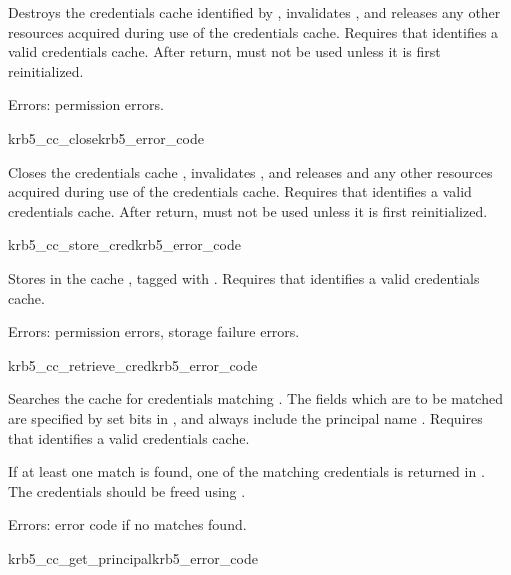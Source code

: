 Destroys the credentials cache identified by , invalidates
, and releases any other resources acquired during use of
the credentials cache.  Requires that  identifies a valid
credentials cache.  After return,  must not be used unless
it is first reinitialized.

Errors:  permission errors.

\begin{funcdecl}{krb5_cc_close}{krb5_error_code}{\funcinout}
\end{funcdecl}

Closes the credentials cache , invalidates
, and releases  and any other resources
acquired during use of the credentials cache.  Requires that
 identifies a valid credentials cache.  After return,
 must not be used unless it is first reinitialized.


\begin{funcdecl}{krb5_cc_store_cred}{krb5_error_code}{\funcin}
\end{funcdecl}

Stores  in the cache , tagged with
.
Requires that  identifies a valid credentials cache.

Errors: permission errors, storage failure errors.

\begin{funcdecl}{krb5_cc_retrieve_cred}{krb5_error_code}{\funcin}
\funcout
{}
\end{funcdecl}

Searches the cache  for credentials matching
.  The fields which are to be matched are specified by
set bits in , and always include the principal
name .
Requires that  identifies a valid credentials cache.

If at least one match is found, one of the matching credentials is
returned in . The credentials should be freed using
.

Errors: error code if no matches found.

\begin{funcdecl}{krb5_cc_get_principal}{krb5_error_code}{\funcin}
\end{funcdecl}

